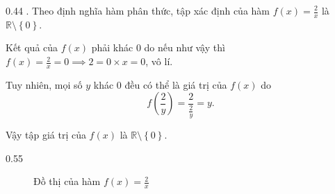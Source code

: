 {
   \begin{minipageindent}{0.44\textwidth}
      \setcounter{subexercise}{1}
      . Theo định nghĩa hàm phân thức, tập xác định của hàm $f(x) = \frac{2}{x}$ là $\mathbb{R} \setminus \left\{0\right\}$.
      
      Kết quả của $f(x)$ phải khác $0$ do nếu như vậy thì $f(x) = \frac{2}{x} = 0 \implies 2 = 0\times x = 0$, vô lí.
      
      Tuy nhiên, mọi số $y$ khác $0$ đều có thể là giá trị của $f(x)$ do $$f\left(\frac{2}{y}\right) = \frac{2}{\frac{2}{y}} = y.$$
      
      Vậy tập giá trị của $f(x)$ là $\mathbb{R} \setminus \left\{0\right\}$.
   \end{minipageindent}
   \hfill
   \begin{minipageindent}{0.55\textwidth}
      \begin{figure}[H]
         \centering
         \caption{Đồ thị của hàm $f(x) = \frac{2}{x}$}
         \label{fig:ham_so_mot_bien:phan_thuc:2_x}
      \end{figure}
   \end{minipageindent}
}

